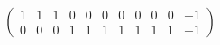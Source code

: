 \[
 \left(\begin{array}{rrrrrrrrrrr}
1 & 1 & 1 & 0 & 0 & 0 & 0 & 0 & 0 & 0 & -1 \\
0 & 0 & 0 & 1 & 1 & 1 & 1 & 1 & 1 & 1 & -1
\end{array}\right) 
\]